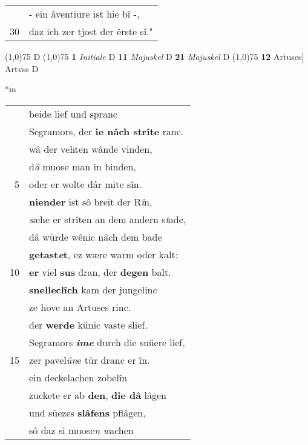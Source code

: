 \documentclass[8pt,a4paper,notitlepage]{article}
\begin{document}
\begin{table}[ht]
\begin{minipage}[t]{0.5\linewidth}
\begin{tabular}{rl}
 & - ein âventiure ist hie bî -,\\ 
30 & daz ich zer tjost der êrste sî."\\ 
\end{tabular}
\scriptsize
\line(1,0){75} \newline
D \newline
\line(1,0){75} \newline
\textbf{1} \textit{Initiale} D  \textbf{11} \textit{Majuskel} D  \textbf{21} \textit{Majuskel} D  \newline
\line(1,0){75} \newline
\textbf{12} Artuses] Artvss D \newline
\end{minipage}
\hspace{0.5cm}
\begin{minipage}[t]{0.5\linewidth}
\small
\begin{center}*m
\end{center}
\begin{tabular}{rl}
 & beide lief und spranc\\ 
 & Segramors, der \textbf{ie nâch strîte} ranc.\\ 
 & wâ der vehten wânde vinden,\\ 
 & d\textit{â} muose man in binden,\\ 
5 & oder er wolte dâr mite sîn.\\ 
 & \textbf{niender} ist sô breit der R\textit{î}n,\\ 
 & \textit{s}æhe er strîten an dem andern s\textit{t}ade,\\ 
 & dâ würde wênic nâch dem bade\\ 
 & \textbf{getast\textit{e}t}, ez wære warm oder kalt:\\ 
10 & \textbf{er} viel \textbf{sus} dran, der \textbf{degen} balt.\\ 
 & \textbf{snelleclîch} kam der jungelinc\\ 
 & ze hove an Artuses rinc.\\ 
 & der \textbf{werde} künic vaste slief.\\ 
 & Segramors \textit{\textbf{ime}} durch die snüere lief,\\ 
15 & zer pavel\textit{ûn}e tür dranc er în.\\ 
 & ein deckelachen zobelîn\\ 
 & zuckete er ab \textbf{den}, \textbf{die dâ} lâgen\\ 
 & und süezes \textbf{slâfens} pflâgen,\\ 
 & sô daz si muose\textit{n} \textit{w}achen\\ 

\end{tabular}
\end{minipage}
\end{table}
\end{document}
